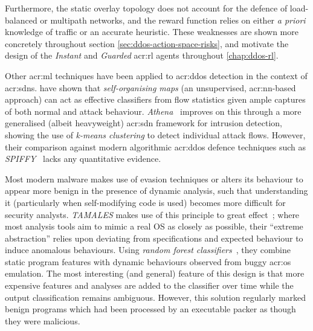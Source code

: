 Furthermore, the static overlay topology does not account for the defence of load-balanced or multipath networks, and the reward function relies on either \emph{a priori} knowledge of traffic or an accurate heuristic.
These weaknesses are shown more concretely throughout section \cref{sec:ddos-action-space-risks}, and motivate the design of the \emph{Instant} and \emph{Guarded} \gls{acr:rl} agents throughout \cref{chap:ddos-rl}.

Other \gls{acr:ml} techniques have been applied to \gls{acr:ddos} detection in the context of \glspl{acr:sdn}.
\textcite{DBLP:conf/lcn/BragaMP10} have shown that \emph{self-organising maps} (an unsupervised, \gls{acr:nn}-based approach) can act as effective classifiers from flow statistics given ample captures of both normal and attack behaviour.
\emph{Athena}~\parencite{DBLP:conf/dsn/LeeKSPY17} improves on this through a more generalised (albeit heavyweight) \gls{acr:sdn} framework for intrusion detection, showing the use of \emph{k-means clustering} to detect individual attack flows.
However, their comparison against modern algorithmic \gls{acr:ddos} defence techniques such as \emph{SPIFFY}~\parencite{DBLP:conf/ndss/KangGS16} lacks any quantitative evidence.

Most modern malware makes use of evasion techniques or alters its behaviour to appear more benign in the presence of dynamic analysis, such that understanding it (particularly when self-modifying code is used) becomes more difficult for security analysts.
\emph{TAMALES} makes use of this principle to great effect~\parencite{DBLP:conf/acsac/CoptyDEEMZ18}; where most analysis tools aim to mimic a real OS as closely as possible, their ``extreme abstraction'' relies upon deviating from specifications and expected behaviour to induce anomalous behaviours.
Using \emph{random forest classifiers}~\parencite{DBLP:journals/ml/Breiman01}, they combine static program features with dynamic behaviours observed from buggy \gls{acr:os} emulation.
The most interesting (and general) feature of this design is that more expensive features and analyses are added to the classifier over time while the output classification remains ambiguous.
However, this solution regularly marked benign programs which had been processed by an executable packer as though they were malicious.

